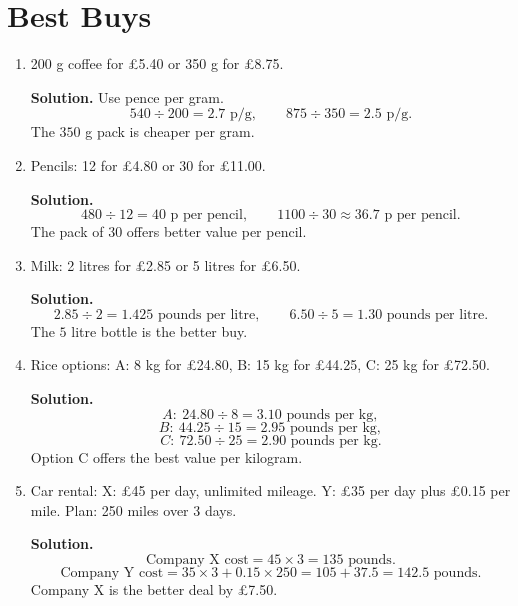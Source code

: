 \documentclass[12pt,a4paper]{article}
\begin{document}
\section*{Best Buys}
\begin{enumerate}
\item 200 g coffee for \pounds5.40 or 350 g for \pounds8.75.

\textbf{Solution.} Use pence per gram.
\[
540\div200=2.7\text{ p/g},\qquad 875\div350=2.5\text{ p/g}.
\]
The \(350\) g pack is cheaper per gram.

\item Pencils: 12 for \pounds4.80 or 30 for \pounds11.00.

\textbf{Solution.}
\[
480\div12=40\text{ p per pencil},\qquad 1100\div30\approx36.7\text{ p per pencil}.
\]
The pack of \(30\) offers better value per pencil.

\item Milk: 2 litres for \pounds2.85 or 5 litres for \pounds6.50.

\textbf{Solution.}
\[
2.85\div2=1.425\text{ pounds per litre},\qquad 6.50\div5=1.30\text{ pounds per litre}.
\]
The \(5\) litre bottle is the better buy.

\item Rice options:
A: 8 kg for \pounds24.80,
B: 15 kg for \pounds44.25,
C: 25 kg for \pounds72.50.

\textbf{Solution.}
\[
A:\ 24.80\div8=3.10\text{ pounds per kg},
\]
\[
B:\ 44.25\div15=2.95\text{ pounds per kg},
\]
\[
C:\ 72.50\div25=2.90\text{ pounds per kg}.
\]
Option C offers the best value per kilogram.

\item Car rental:
X: \pounds45 per day, unlimited mileage.
Y: \pounds35 per day plus \pounds0.15 per mile.
Plan: 250 miles over 3 days.

\textbf{Solution.}
\[
\text{Company X cost}=45\times3=135\text{ pounds}.
\]
\[
\text{Company Y cost}=35\times3+0.15\times250=105+37.5=142.5\text{ pounds}.
\]
Company X is the better deal by \pounds7.50.
\end{enumerate}
\end{document}
